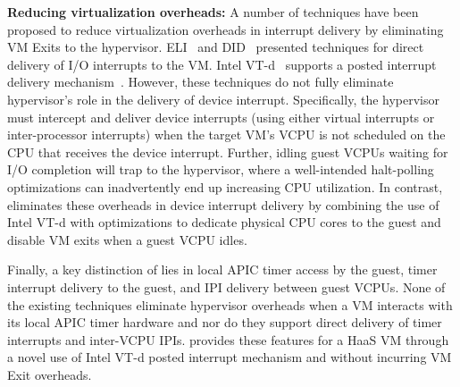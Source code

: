 {\bf Reducing virtualization overheads:}
A number of techniques have been proposed to reduce virtualization
overheads in interrupt delivery by eliminating VM Exits to the hypervisor.
ELI~\cite{amit:2015} and DID~\cite{tu:2015} presented techniques
for direct delivery of I/O interrupts to the VM. 
Intel VT-d~\cite{intelvtd-paper,intelvtd-manual} supports a posted interrupt delivery mechanism~\cite{postedinterrupt}.
However, these techniques do not fully eliminate hypervisor's role
in the delivery of device interrupt.
Specifically, the hypervisor must intercept and deliver device interrupts
(using either virtual interrupts or inter-processor interrupts)
when the target VM's VCPU is not scheduled on the CPU
that receives the device interrupt. Further, idling guest VCPUs
waiting for I/O completion will trap to the hypervisor, where a well-intended
halt-polling optimizations can inadvertently end up increasing CPU utilization.
In contrast, \na eliminates these 
overheads in device interrupt delivery by 
combining the use of Intel VT-d with optimizations to
dedicate physical CPU cores to the guest and disable VM exits when a guest VCPU idles.

Finally, a key distinction of \na lies in local APIC timer
access by the guest, timer interrupt delivery to the guest, and IPI 
delivery between guest VCPUs.
None of the existing techniques eliminate hypervisor overheads 
when a VM interacts with its local APIC timer hardware and nor do they 
support direct delivery of timer interrupts and inter-VCPU IPIs.
\na provides these features for a HaaS VM through a novel 
use of Intel VT-d posted interrupt mechanism and without 
incurring VM Exit overheads.



